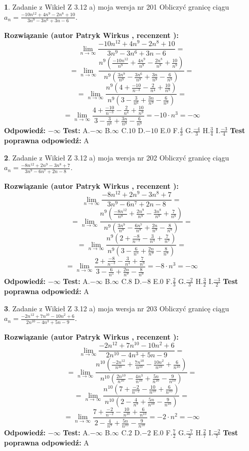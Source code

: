 \documentclass[12pt, a4paper]{article}
\theoremstyle{definition} %
\newtheorem{zad}{}
\newcommand{\zadStart}[1]{\begin{zad}#1\newline}
\newcommand{\zadStop}{\end{zad}}
\newcommand{\rozwStart}[2]{\noindent \textbf{Rozwiązanie (autor #1 , recenzent #2): }\newline}
\newcommand{\rozwStop}{\newline}
\newcommand{\odpStart}{\noindent \textbf{Odpowiedź:}\newline}
\newcommand{\odpStop}{\newline}
\newcommand{\testStart}{\noindent \textbf{Test:}\newline}
\newcommand{\testStop}{\newline}
\newcommand{\kluczStart}{\noindent \textbf{Test poprawna odpowiedź:}\newline}
\newcommand{\kluczStop}{\newline}
\begin{document}
\zadStart{Zadanie z Wikieł Z 3.12 a) moja wersja nr 201}
Obliczyć granicę ciągu $a_{n}=\frac{-10n^{12}+4n^{9}-2n^{8}+10}{3n^{9}-3n^{6}+3n-6}$.
\zadStop
\rozwStart{Patryk Wirkus}{}
$$\lim\limits_{n\to\infty}\frac{-10n^{12}+4n^{9}-2n^{8}+10}{3n^{9}-3n^{6}+3n-6}=$$
$$=\lim\limits_{n\to\infty}\frac{n^{9}\left(\frac{-10n^{12}}{n^{9}}+\frac{4n^{9}}{n^{9}}-\frac{2n^{8}}{n^{9}}+\frac{10}{n^{9}}\right)}{n^{9}\left(\frac{3n^{9}}{n^{9}}-\frac{3n^{6}}{n^{9}}+\frac{3n}{n^{9}}-\frac{6}{n^{9}}\right)}=$$
$$=\lim\limits_{n\to\infty}\frac{n^{9}\left(4+\frac{-10}{n^{-3}}-\frac{2}{n^{4}}+\frac{10}{n^{9}}\right)}
{n^{9}\left(3-\frac{3}{n^{6}}+\frac{3n}{n^{9}}-\frac{6}{n^{9}}\right)}=$$
$$=\lim\limits_{n\to\infty}\frac{4+\frac{-10}{n^{-3}}-\frac{2}{n^{4}}+\frac{10}{n^{9}}}{3-\frac{3}{n^{6}}+\frac{3n}{n^{9}}-\frac{6}{n^{9}}}=-10\cdot n^{3} = -\infty$$
\rozwStop
\odpStart
$-\infty$
\odpStop
\testStart
A.$-\infty$
B.$\infty$
C.$10$
D.$-10$
E.$0$
F.$\frac{4}{3}$
G.$\frac{-4}{3}$
H.$\frac{3}{4}$
I.$\frac{-3}{4}$
\testStop
\kluczStart
A
\kluczStop



\zadStart{Zadanie z Wikieł Z 3.12 a) moja wersja nr 202}
Obliczyć granicę ciągu $a_{n}=\frac{-8n^{12}+2n^{9}-3n^{8}+7}{3n^{9}-6n^{7}+2n-8}$.
\zadStop
\rozwStart{Patryk Wirkus}{}
$$\lim\limits_{n\to\infty}\frac{-8n^{12}+2n^{9}-3n^{8}+7}{3n^{9}-6n^{7}+2n-8}=$$
$$=\lim\limits_{n\to\infty}\frac{n^{9}\left(\frac{-8n^{12}}{n^{9}}+\frac{2n^{9}}{n^{9}}-\frac{3n^{8}}{n^{9}}+\frac{7}{n^{9}}\right)}{n^{9}\left(\frac{3n^{9}}{n^{9}}-\frac{6n^{7}}{n^{9}}+\frac{2n}{n^{9}}-\frac{8}{n^{9}}\right)}=$$
$$=\lim\limits_{n\to\infty}\frac{n^{9}\left(2+\frac{-8}{n^{-3}}-\frac{3}{n^{4}}+\frac{7}{n^{9}}\right)}
{n^{9}\left(3-\frac{6}{n^{5}}+\frac{2n}{n^{9}}-\frac{8}{n^{9}}\right)}=$$
$$=\lim\limits_{n\to\infty}\frac{2+\frac{-8}{n^{-3}}-\frac{3}{n^{4}}+\frac{7}{n^{9}}}{3-\frac{6}{n^{5}}+\frac{2n}{n^{9}}-\frac{8}{n^{9}}}=-8\cdot n^{3} = -\infty$$
\rozwStop
\odpStart
$-\infty$
\odpStop
\testStart
A.$-\infty$
B.$\infty$
C.$8$
D.$-8$
E.$0$
F.$\frac{2}{3}$
G.$\frac{-2}{3}$
H.$\frac{3}{2}$
I.$\frac{-3}{2}$
\testStop
\kluczStart
A
\kluczStop



\zadStart{Zadanie z Wikieł Z 3.12 a) moja wersja nr 203}
Obliczyć granicę ciągu $a_{n}=\frac{-2n^{12}+7n^{10}-10n^{2}+6}{2n^{10}-4n^{3}+5n-9}$.
\zadStop
\rozwStart{Patryk Wirkus}{}
$$\lim\limits_{n\to\infty}\frac{-2n^{12}+7n^{10}-10n^{2}+6}{2n^{10}-4n^{3}+5n-9}=$$
$$=\lim\limits_{n\to\infty}\frac{n^{10}\left(\frac{-2n^{12}}{n^{10}}+\frac{7n^{10}}{n^{10}}-\frac{10n^{2}}{n^{10}}+\frac{6}{n^{10}}\right)}{n^{10}\left(\frac{2n^{10}}{n^{10}}-\frac{4n^{3}}{n^{10}}+\frac{5n}{n^{10}}-\frac{9}{n^{10}}\right)}=$$
$$=\lim\limits_{n\to\infty}\frac{n^{10}\left(7+\frac{-2}{n^{-2}}-\frac{10}{n^{10}}+\frac{6}{n^{10}}\right)}
{n^{10}\left(2-\frac{4}{n^{9}}+\frac{5n}{n^{10}}-\frac{9}{n^{10}}\right)}=$$
$$=\lim\limits_{n\to\infty}\frac{7+\frac{-2}{n^{-2}}-\frac{10}{n^{10}}+\frac{6}{n^{10}}}{2-\frac{4}{n^{9}}+\frac{5n}{n^{10}}-\frac{9}{n^{10}}}=-2\cdot n^{2} = -\infty$$
\rozwStop
\odpStart
$-\infty$
\odpStop
\testStart
A.$-\infty$
B.$\infty$
C.$2$
D.$-2$
E.$0$
F.$\frac{7}{2}$
G.$\frac{-7}{2}$
H.$\frac{2}{7}$
I.$\frac{-2}{7}$
\testStop
\kluczStart
A
\kluczStop
\end{document}
